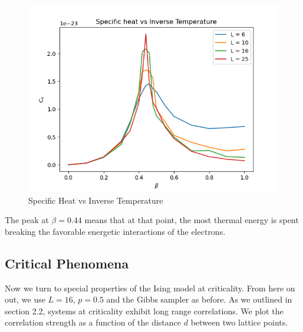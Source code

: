 \documentclass{article}
\begin{document}
\begin{figure}[ht]
    \includegraphics[width=\columnwidth]{plots/specific_heat.png}
    \caption{Specific Heat vs Inverse Temperature}
    \label{fig:6}
\end{figure}

The peak at $\beta=0.44$ means that at that point, the most thermal energy is spent breaking the favorable energetic interactions of the
electrons.

\subsection{Critical Phenomena}
Now we turn to special properties of the Ising model at criticality. From here on out, we use $L=16$, $p=0.5$ and the Gibbs sampler as before. As we outlined in section 2.2, systems at criticality
exhibit long range correlations. We plot the correlation strength as a function of the distance $d$ between
two lattice points. 
\end{document}
